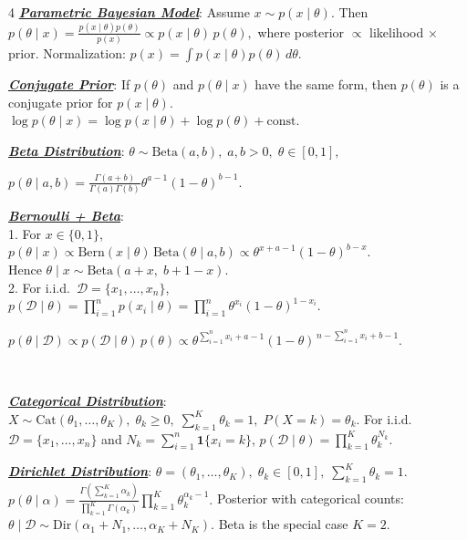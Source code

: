 \documentclass[12pt]{article}
\newcommand{\bulletPoint}[1]{\underline{\textit{\textbf{#1}}}}
\begin{document}
\begin{multicols*}{4}
\bulletPoint{Parametric Bayesian Model}:
Assume $x\sim p(x\mid \theta)$. Then
$p(\theta\mid x)=\frac{p(x\mid \theta)p(\theta)}{p(x)}
\propto p(x\mid \theta)\,p(\theta),$
where posterior $\propto$ likelihood $\times$ prior.
Normalization:
$p(x)=\int p(x\mid \theta)p(\theta)\,d\theta.$

\bulletPoint{Conjugate Prior}:
If $p(\theta)$ and $p(\theta\mid x)$ have the same form, then $p(\theta)$ is a conjugate prior for $p(x\mid \theta)$.
$\log p(\theta\mid x)=\log p(x\mid \theta)+\log p(\theta)+\mathrm{const}.$

\bulletPoint{Beta Distribution}:
$\theta\sim \mathrm{Beta}(a,b),\; a,b>0,\; \theta\in[0,1],$

$p(\theta\mid a,b)=
\frac{\Gamma(a+b)}{\Gamma(a)\Gamma(b)}
\theta^{a-1}(1-\theta)^{b-1}.
$

\bulletPoint{Bernoulli + Beta}:\\
1. For $x\in\{0,1\}$,
{\color{blue}$p(\theta\mid x)\propto \mathrm{Bern}(x\mid \theta)\,\mathrm{Beta}(\theta\mid a,b)
\propto \theta^{x+a-1}(1-\theta)^{b-x}.$}\\
Hence
$\theta\mid x \sim \mathrm{Beta}(a+x,\; b+1-x).$\\
2. For i.i.d.\ $\mathcal D=\{x_1,\dots,x_n\}$,\\
$p(\mathcal{D}\mid \theta)=
\prod_{i=1}^n p(x_i\mid \theta)=
\prod_{i=1}^n \theta^{x_i}(1-\theta)^{1-x_i}.$

{\color{blue}$p(\theta\mid \mathcal{D})
\propto
p(\mathcal{D}\mid \theta)\,p(\theta)
\propto
	\theta^{\sum_{i=1}^n x_i + a - 1}
(1-\theta)^{\,n-\sum_{i=1}^n x_i + b - 1}.$}

\useshortskip\noindent{}\\
\useshortskip\noindent{}

\bulletPoint{Categorical Distribution}:
$X\sim \mathrm{Cat}(\theta_1,\dots,\theta_K),\;
\theta_k\ge 0,\; \sum_{k=1}^K \theta_k=1,\;
P(X=k)=\theta_k.$
For i.i.d.\ $\mathcal D=\{x_1,\dots,x_n\}$ and
$N_k=\sum_{i=1}^n \mathbf 1\{x_i=k\}$,
{\color{blue}
$p(\mathcal D\mid \theta)=\prod_{k=1}^K \theta_k^{N_k}.$
}

\bulletPoint{Dirichlet Distribution}:
$\theta=(\theta_1,\dots,\theta_K),\;
\theta_k\in[0,1],\; \sum_{k=1}^K \theta_k=1.$
{\color{blue}
$p(\theta\mid \alpha)=
\frac{\Gamma(\sum_{k=1}^K \alpha_k)}{\prod_{k=1}^K \Gamma(\alpha_k)}
\prod_{k=1}^K \theta_k^{\alpha_k-1}.$
}
Posterior with categorical counts:
$\theta\mid \mathcal D \sim
\mathrm{Dir}(\alpha_1+N_1,\dots,\alpha_K+N_K).$
Beta is the special case $K=2$.


\end{multicols*}
\end{document}

